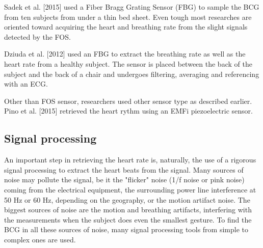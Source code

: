 \documentclass[twoside,onecolumn]{article}
\begin{document}
Sadek et al. [2015] used a Fiber Bragg Grating Sensor (FBG) to sample the BCG from ten subjects from under a thin bed sheet. Even tough most researches are oriented toward acquiring the heart and breathing rate from the slight signals detected by the FOS. 

Dziuda et al. [2012] used  an FBG to extract the breathing rate as well as the heart rate from a healthy subject. The sensor is placed between the back of the subject and the back of a chair and undergoes filtering, averaging and referencing with an ECG.

Other than FOS sensor, researchers used other sensor type as described earlier. Pino et al. [2015] retrieved the heart rythm using an EMFi piezoelectric sensor.

\subsection{Signal processing}
An important step in retrieving the heart rate is, naturally, the use of a rigorous signal processing to extract the heart beats from the signal. Many sources of noise may pollute the signal, be it the "flicker" noise (1/f noise or pink noise) coming from the electrical equipment, the surrounding power line interference at 50 Hz or 60 Hz, depending on the geography, or the motion artifact noise. The biggest sources of noise are the motion and breathing artifacts, interfering with the measurements when the subject does even the smallest gesture. To find the BCG in all these sources of noise, many signal processing tools from simple to complex ones are used.
\end{document}
